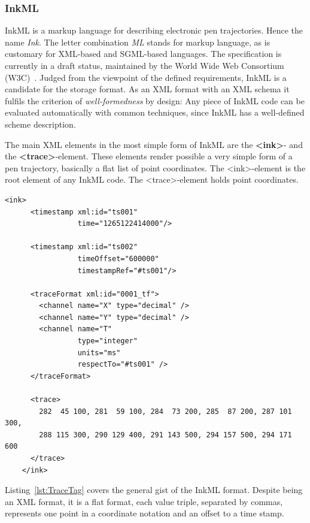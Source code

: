 \subsubsection{InkML}
\label{sec:hwre:inkml}

InkML is a markup language for describing electronic pen trajectories. 
Hence the name \emph{Ink}. The letter combination \emph{ML} stands for markup 
language, as is customary 
for XML-based and SGML-based languages. The specification is currently in a 
draft status, maintained by the World Wide Web Consortium 
(W3C)~.
Judged from the viewpoint of the defined requirements, InkML is a candidate
for the storage format. As an XML format with an XML schema it fulfils the 
criterion of \emph{well-formedness} by design: 
Any piece of InkML code can be evaluated automatically with common techniques, 
since InkML has a well-defined scheme description.

The main XML elements in the most simple form of InkML are 
the \textbf{<ink>}- and the \textbf{<trace>}-element.
These elements render possible a very simple form of a pen trajectory, 
basically a flat list of point coordinates.
The <ink>-element is the root element of any InkML code. 
The <trace>-element holds point coordinates.
\begin{xmlcode}
  \begin{lstlisting}[emph={trace,timestamp,channel},
                     emphstyle=\color{blue}\textbf,
                     emph={[2]name,type,units,respectTo,time,
                              timeOffset,timestampRef},
                     caption={Demonstration of the \emph{time channel} and the \emph{trace} tag},
                     label=lst:TraceTag]
    <ink>
      <timestamp xml:id="ts001" 
                 time="1265122414000"/>

      <timestamp xml:id="ts002" 
                 timeOffset="600000" 
                 timestampRef="#ts001"/>

      <traceFormat xml:id="0001_tf">
        <channel name="X" type="decimal" />
        <channel name="Y" type="decimal" />
        <channel name="T" 
                 type="integer" 
                 units="ms" 
                 respectTo="#ts001" />
      </traceFormat>

      <trace>
        282  45 100, 281  59 100, 284  73 200, 285  87 200, 287 101 300, 
        288 115 300, 290 129 400, 291 143 500, 294 157 500, 294 171 600
      </trace>
    </ink>
  \end{lstlisting}
\end{xmlcode}
Listing~\ref{lst:TraceTag} covers the general gist of the InkML format.
Despite being an XML format, it is a flat format, each value triple, 
separated by commas, represents one point in a coordinate notation and
an offset to a time stamp.

